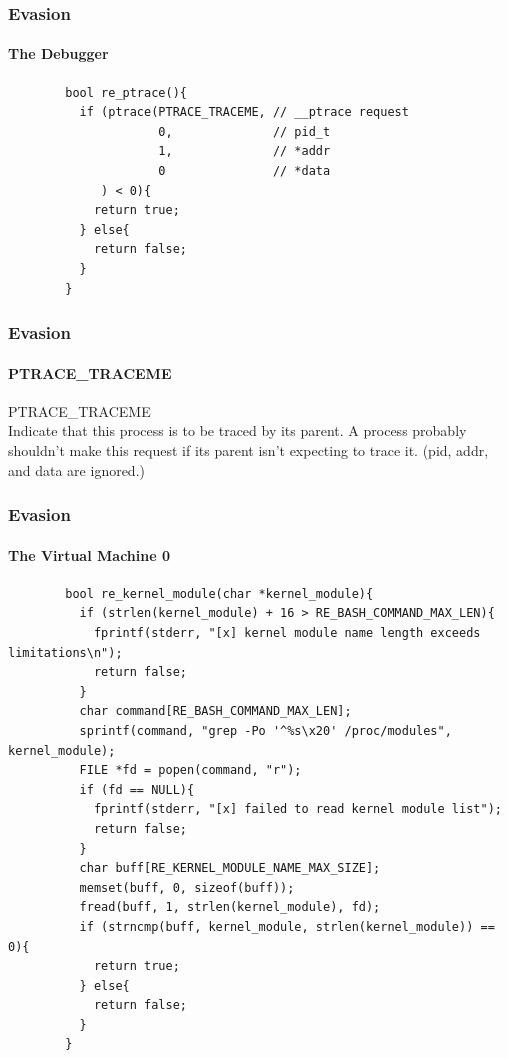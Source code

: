 \documentclass[aspectratio=169]{beamer}
\begin{document}
\begin{frame}[fragile]{}
  \frametitle{Evasion}
  \framesubtitle{The Debugger}
  \begin{center}
    \begin{tcolorbox}[title=re.c,colback=black]
    \begin{minipage}{0.5\textwidth}
      \begin{verbatim}
        bool re_ptrace(){
          if (ptrace(PTRACE_TRACEME, // __ptrace request
                     0,              // pid_t
                     1,              // *addr
                     0               // *data
             ) < 0){
            return true;
          } else{
            return false;
          }
        }
      \end{verbatim}
    \end{minipage}
    \end{tcolorbox}
  \end{center}
\end{frame}

\begin{frame}
  \frametitle{Evasion}
  \framesubtitle{PTRACE\_TRACEME}
  \begin{tcolorbox}[title=ptrace.log,colback=gray]
    PTRACE\_TRACEME \\
       Indicate that this process is to be traced by its parent.  A process probably shouldn't  make this request if its parent isn't expecting to trace it. (pid, addr, and data are ignored.)\\
  \end{tcolorbox}
\end{frame}

\begin{frame}[fragile]{}
  \frametitle{Evasion}
  \framesubtitle{The Virtual Machine 0}
  \begin{center}
    \begin{tcolorbox}[title=re.c,colback=black]
    \begin{minipage}{0.5\textwidth}
      \begin{verbatim}
        bool re_kernel_module(char *kernel_module){
          if (strlen(kernel_module) + 16 > RE_BASH_COMMAND_MAX_LEN){
            fprintf(stderr, "[x] kernel module name length exceeds limitations\n");
            return false;
          }
          char command[RE_BASH_COMMAND_MAX_LEN];
          sprintf(command, "grep -Po '^%s\x20' /proc/modules", kernel_module);
          FILE *fd = popen(command, "r");
          if (fd == NULL){
            fprintf(stderr, "[x] failed to read kernel module list");
            return false;
          }
          char buff[RE_KERNEL_MODULE_NAME_MAX_SIZE];
          memset(buff, 0, sizeof(buff));
          fread(buff, 1, strlen(kernel_module), fd);
          if (strncmp(buff, kernel_module, strlen(kernel_module)) == 0){
            return true;
          } else{
            return false;
          }
        }
      \end{verbatim}
    \end{minipage}
    \end{tcolorbox}
  \end{center}
\end{frame}
\end{document}
